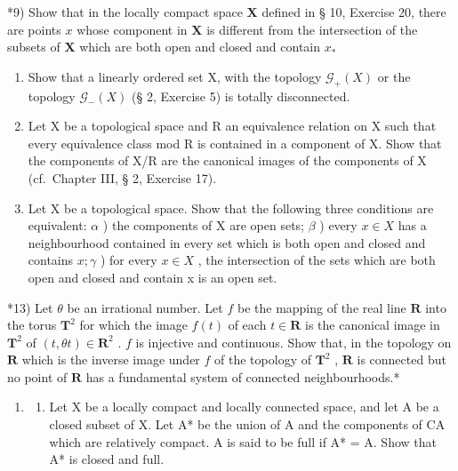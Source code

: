 *9) Show that in the locally compact space \(\mathbf{X}\) defined in § 10, Exercise 20, there are points \(x\) whose component in \(\mathbf{X}\) is different from the intersection of the subsets of \(\mathbf{X}\) which are both open and closed and contain \(x_*\)

\begin{enumerate}
\def\labelenumi{\arabic{enumi})}
\setcounter{enumi}{9}
\item
  Show that a linearly ordered set X, with the topology \(\mathcal{G}_{+}(X)\) or the topology \(\mathcal{G}_{-}(X)\) (§ 2, Exercise 5) is totally disconnected.
\item
  Let X be a topological space and R an equivalence relation on X such that every equivalence class mod R is contained in a component of X. Show that the components of X/R are the canonical images of the components of X (cf.~Chapter III, § 2, Exercise 17).
\item
  Let X be a topological space. Show that the following three conditions are equivalent: \(\alpha\) ) the components of X are open sets; \(\beta\) ) every \(x \in X\) has a neighbourhood contained in every set which is both open and closed and contains \(x; \gamma\) ) for every \(x \in X\) , the intersection of the sets which are both open and closed and contain x is an open set.
\end{enumerate}

*13) Let \(\theta\) be an irrational number. Let \(f\) be the mapping of the real line \(\mathbf{R}\) into the torus \(\mathbf{T}^2\) for which the image \(f(t)\) of each \(t \in \mathbf{R}\) is the canonical image in \(\mathbf{T}^2\) of \((t, \theta t) \in \mathbf{R}^2\) . \(f\) is injective and continuous. Show that, in the topology on \(\mathbf{R}\) which is the inverse image under \(f\) of the topology of \(\mathbf{T}^2\) , \(\mathbf{R}\) is connected but no point of \(\mathbf{R}\) has a fundamental system of connected neighbourhoods.*

\begin{enumerate}
\def\labelenumi{\arabic{enumi})}
\setcounter{enumi}{13}
\tightlist
\item
  \begin{enumerate}
  \def\labelenumii{\alph{enumii})}
  \tightlist
  \item
    Let X be a locally compact and locally connected space, and let A be a closed subset of X. Let A* be the union of A and the components of CA which are relatively compact. A is said to be full if A* = A. Show that A* is closed and full.
  \end{enumerate}
\end{enumerate}

